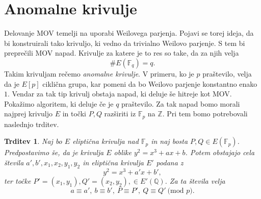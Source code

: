 \documentclass[12pt,a4paper,twoside]{article}
\theoremstyle{definition} %
\theoremstyle{plain} %
\newtheorem{trditev}[definicija]{Trditev}
\numberwithin{equation}{section}  %
\newcommand{\Z}{\mathbb Z}
\newcommand{\Q}{\mathbb Q}
\newcommand{\F}{\mathbb F}
\newcommand{\E}[1]{E({#1})}
\newcommand{\MOD}[1]{\ \text{(mod }{#1}\text{)}}
\begin{document}
\section{Anomalne krivulje}

Delovanje MOV temelji na uporabi Weilovega parjenja. Pojavi se torej ideja, da bi konstruirali tako krivuljo, ki vedno da trivialno Weilovo parjenje. S tem bi preprečili MOV napad. Krivulje za katere je to res so take, da za njih velja
$$\#\E{\F_q} = q.$$
Takim krivuljam rečemo \emph{anomalne krivulje}. V primeru, ko je $p$ praštevilo, velja da je $E[p]$ ciklična grupa, kar pomeni da bo Weilovo parjenje konstantno enako $1$. Vendar za tak tip krivulj obstaja napad, ki deluje še hitreje kot MOV.
Pokažimo algoritem, ki deluje če je $q$ praštevilo.
Za tak napad bomo morali najprej krivuljo $E$ in točki $P,Q$ razširiti iz $\F_p$ na $\Z$. Pri tem bomo potrebovali naslednjo trditev.

\begin{trditev}
\label{trd:5.6}
Naj bo $E$ eliptična krivulja nad $\F_p$ in naj bosta $P,Q \in \E{\F_p}$. Predpostavimo še, da je krivulja $E$ oblike $y^2=x^3+ax+b$. Potem obstajajo cela števila
$a',b',x_1,x_2,y_1,y_2$ in eliptična krivulja $E'$ podana z
$$y^2=x^3+a'x+b',$$
ter točke $P'=(x_1,y_1),Q'=(x_2,y_2), \in E'(\Q)$.
Za ta števila velja
$$a\equiv a',\ b \equiv b',\ P \equiv P',\ Q \equiv Q' \MOD{p}.$$

\end{trditev}
\end{document}
